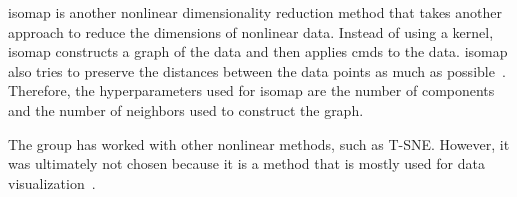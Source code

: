 \gls{isomap} is another nonlinear dimensionality reduction method that takes another approach to reduce the dimensions of nonlinear data. Instead of using a kernel, \gls{isomap} constructs a graph of the data and then applies \gls{cmds} to the data. \gls{isomap} also tries to preserve the distances between the data points as much as possible~\cite{dimensionality-reduction-comparative-review}. Therefore, the hyperparameters used for \gls{isomap} are the number of components and the number of neighbors used to construct the graph.


The group has worked with other nonlinear methods, such as T-SNE. However, it was ultimately not chosen because it is a method that is mostly used for data visualization~\cite{tsne-visualization}.

